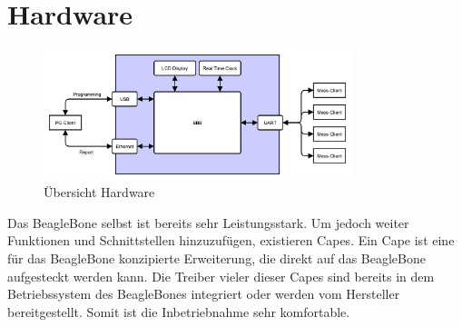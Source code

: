 
\section{Hardware}
\label{ServerHardware}

\begin{figure}[H]
\begin{center}
\includegraphics[width=0.8\textwidth ]{img/general/UebersichtMaster.pdf}
\caption{Übersicht Hardware}
\label{figure_AufbauBleagleBone}
\end{center}
\end{figure}

Das BeagleBone selbst ist bereits sehr Leistungsstark. Um jedoch weiter Funktionen und Schnittstellen hinzuzufügen, existieren Capes. Ein Cape ist eine für das BeagleBone konzipierte Erweiterung, die direkt auf das BeagleBone aufgesteckt werden kann. Die Treiber vieler dieser Capes sind bereits in dem Betriebssystem des BeagleBones integriert oder werden vom Hersteller bereitgestellt. Somit ist die Inbetriebnahme sehr komfortable.


